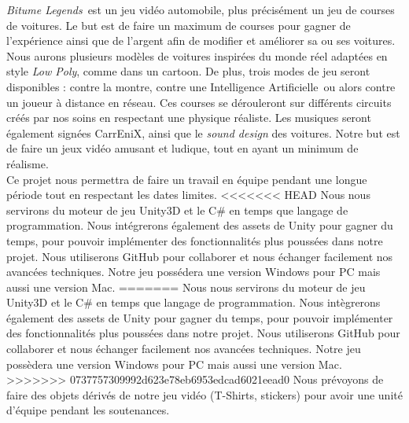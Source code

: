 \documentclass[12pt,a4paper]{article}
\newcommand{\btmlgs}{\textit{Bitume Legends}}
\newcommand{\AI}{Intelligence Artificielle}
\newcommand{\CEX}{CarrEniX}
\begin{document}
\btmlgs\, est un jeu vidéo automobile, plus précisément un jeu de courses de voitures. Le but est 
de faire un maximum de courses pour gagner de l'expérience ainsi que de l'argent afin de
modifier et améliorer sa ou ses voitures.
Nous aurons plusieurs modèles de voitures inspirées du monde réel adaptées en style \textit{Low Poly},
comme dans un cartoon. De plus, trois modes de jeu seront disponibles : contre la montre, contre une \AI\,
ou alors contre un joueur à distance en réseau. Ces courses se dérouleront sur différents circuits créés 
par nos soins en respectant une physique réaliste.
Les musiques seront également signées \CEX, ainsi que le \textit{sound design} des voitures.
Notre but est de faire un jeux vidéo amusant et ludique, tout en ayant un minimum de réalisme.\\

Ce projet nous permettra de faire un travail en équipe pendant une longue période tout en respectant les dates limites.
<<<<<<< HEAD
Nous nous servirons du moteur de jeu Unity3D et le C\# en temps que langage de programmation. Nous intégrerons 
également des assets de Unity pour gagner du temps, pour pouvoir implémenter des fonctionnalités plus poussées dans notre projet.
Nous utiliserons GitHub pour collaborer et nous échanger facilement nos avancées techniques.
Notre jeu possédera une version Windows pour PC mais aussi une version Mac.
=======
Nous nous servirons du moteur de jeu Unity3D et le C\# en temps que langage de programmation. Nous intègrerons 
également des assets de Unity pour gagner du temps, pour pouvoir implémenter des fonctionnalités plus poussées dans notre projet.
Nous utiliserons GitHub pour collaborer et nous échanger facilement nos avancées techniques.
Notre jeu possèdera une version Windows pour PC mais aussi une version Mac.
>>>>>>> 0737757309992d623e78eb6953edcad6021eead0
Nous prévoyons de faire des objets dérivés de notre jeu vidéo (T-Shirts, stickers) pour avoir une unité d'équipe 
pendant les soutenances.\\


\clearpage
\end{document}
